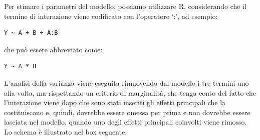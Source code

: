 \documentclass[
  12pt,
]{book}
\newenvironment{Shaded}{\begin{snugshade}}{\end{snugshade}}
\newcommand{\AttributeTok}[1]{\textcolor[rgb]{0.77,0.63,0.00}{#1}}
\newcommand{\CommentTok}[1]{\textcolor[rgb]{0.56,0.35,0.01}{\textit{#1}}}
\newcommand{\DocumentationTok}[1]{\textcolor[rgb]{0.56,0.35,0.01}{\textbf{\textit{#1}}}}
\newcommand{\FunctionTok}[1]{\textcolor[rgb]{0.00,0.00,0.00}{#1}}
\newcommand{\NormalTok}[1]{#1}
\newcommand{\OtherTok}[1]{\textcolor[rgb]{0.56,0.35,0.01}{#1}}
\newcommand{\SpecialCharTok}[1]{\textcolor[rgb]{0.00,0.00,0.00}{#1}}
\begin{document}
Per stimare i parametri del modello, possiamo utilizzare R, considerando che il termine di interazione viene codificato con l'operatore `:', ad esempio:

\begin{verbatim}
Y ~ A + B + A:B
\end{verbatim}

che può essere abbreviato come:

\begin{verbatim}
Y ~ A * B
\end{verbatim}

\begin{Shaded}
\end{Shaded}

L'analisi della varianza viene eseguita rimuovendo dal modello i tre termini uno alla volta, ma rispettando un criterio di marginalità, che tenga conto del fatto che l'interazione viene dopo che sono stati inseriti gli effetti principali che la costituiscono e, quindi, dovrebbe essere omessa per prima e non dovrebbe essere lasciata nel modello, quando uno degli effetti principali coinvolti viene rimosso. Lo schema è illustrato nel box seguente.
\end{document}
